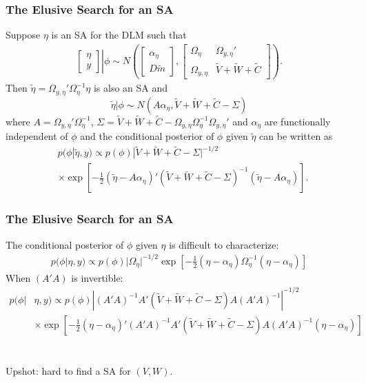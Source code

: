 \documentclass[xcolor=dvipsnames]{beamer}
\begin{document}
\begin{frame}
\frametitle{The Elusive Search for an SA}
Suppose $\eta$ is an SA for the DLM such that
\begin{align*}
 \left. \begin{bmatrix}\eta \\ y \end{bmatrix}\right|\phi \sim N\left(\begin{bmatrix} \alpha_\eta \\ D\tilde{m} \end{bmatrix}, \begin{bmatrix}
   \Omega_\eta & \Omega_{y,\eta}' \\
   \Omega_{y,\eta} & \tilde{V} + \tilde{W} + \tilde{C} \end{bmatrix}\right).
\end{align*}
Then $\tilde{\eta}=\Omega_{y,\eta}'\Omega_{\eta}^{-1}\eta$ is also an SA and
\[
\tilde{\eta}|\phi \sim N(A\alpha_{\eta},\tilde{V} + \tilde{W} + \tilde{C} - \Sigma)
\]
where $A=\Omega_{y,\eta}'\Omega_{\eta}^{-1}$, $\Sigma = \tilde{V} + \tilde{W} + \tilde{C} - \Omega_{y,\eta}\Omega_{\eta}^{-1}\Omega_{y,\eta}'$ and $\alpha_{\eta}$ are functionally independent of $\phi$ and the conditional posterior of $\phi$ given $\tilde{\eta}$ can be written as
\begin{align*}
&p(\phi|\tilde{\eta},y) \propto p(\phi)|\tilde{V} + \tilde{W} + \tilde{C} - \Sigma|^{-1/2}\\
&\times \exp\left[-\frac{1}{2}(\tilde{\eta} - A\alpha_{\eta})'(\tilde{V} + \tilde{W} + \tilde{C} - \Sigma)^{-1}(\tilde{\eta} - A\alpha_{\eta})\right].
\end{align*}
\end{frame}

\begin{frame}
\frametitle{The Elusive Search for an SA}
The conditional posterior of $\phi$ given $\eta$ is difficult to characterize:
\begin{align*}
p(\phi|\eta,y) \propto  p(\phi) |\Omega_{\eta}|^{-1/2}\exp\left[-\frac{1}{2}(\eta-\alpha_{\eta})\Omega_{\eta}^{-1}(\eta-\alpha_{\eta})\right]
\end{align*}
When $(A'A)$ is invertible:
\begin{align*}
p(\phi|&\eta,y) \propto p(\phi) |(A'A)^{-1}A'(\tilde{V} + \tilde{W} + \tilde{C} - \Sigma)A(A'A)^{-1}|^{-1/2}\\
&\times \exp\left[-\frac{1}{2}(\eta - \alpha_{\eta})'(A'A)^{-1}A'(\tilde{V} + \tilde{W} + \tilde{C} - \Sigma)A(A'A)^{-1}(\eta - \alpha_\eta)\right]
\end{align*}
\\~\\
Upshot: hard to find a SA for $(V,W)$.

\end{frame}
\end{document}
